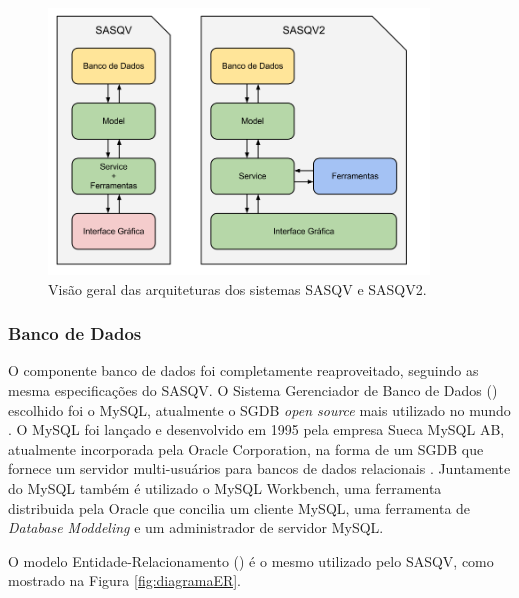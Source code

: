 \begin{figure}[!htb]
	\centering
	\includegraphics[width=0.9\textwidth]{./imgs/arquitetura.png}
	\caption{Visão geral das arquiteturas dos sistemas SASQV e SASQV2.}
	\label{fig:arquitetura}
\end{figure}

\subsubsection{Banco de Dados}

O componente banco de dados foi completamente reaproveitado, seguindo as mesma especificações do SASQV. 
O Sistema Gerenciador de Banco de Dados () escolhido foi o MySQL, atualmente o SGDB \emph{open source} mais utilizado no mundo \cite{mysqlmarket}.
O MySQL foi lançado e desenvolvido em 1995 pela empresa Sueca MySQL AB, atualmente incorporada pela Oracle Corporation, na forma de um SGDB que fornece um servidor multi-usuários para bancos de dados relacionais \cite{wikipediamysql}. 
Juntamente do MySQL também é utilizado o MySQL Workbench, uma ferramenta distribuida pela Oracle que concilia um cliente MySQL, uma ferramenta de \emph{Database Moddeling} e um administrador de servidor MySQL.

O modelo Entidade-Relacionamento () é o mesmo utilizado pelo SASQV, como mostrado na Figura \ref{fig:diagramaER}.

